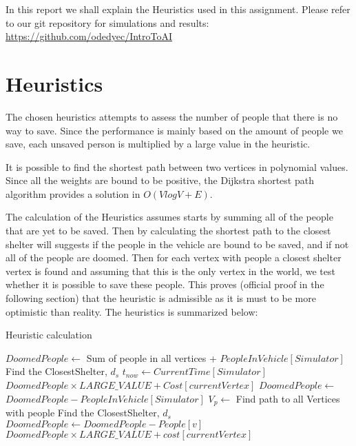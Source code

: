 \documentclass{article}                     %
\begin{document}
	
	In this report we shall explain the Heuristics used in this assignment. Please refer to our git repository for simulations and results:
	\url{https://github.com/odedyec/IntroToAI}
	
	
	
	\section{Heuristics}
	The chosen heuristics attempts to assess the number of people that there is no way to save. Since the performance is mainly based on the amount of people we save, each unsaved person is multiplied by a large value in the heuristic.
	
	It is possible to find the shortest path between two vertices in polynomial values. Since all the weights are bound to be positive, the Dijkstra shortest path algorithm provides a solution in $ O(V logV+E) $.
	
	The calculation of the Heuristics assumes starts by summing all of the people that are yet to be saved. Then by calculating the shortest path to the closest shelter will suggests if the people in the vehicle are bound to be saved, and if not all of the people are doomed. Then for each vertex with people a closest shelter vertex is found and assuming that this is the only vertex in the world, we test whether it is possible to save these people. This proves (official proof in the following section) that the heuristic is admissible as it is must to be more optimistic than reality.
	The heuristics is summarized below:
	
	\begin{algorithm}
		\caption{Heuristic calculation}
		
		\begin{algorithmic}[1]
			\State $ DoomedPeople \longleftarrow$ Sum of people in all vertices + $ PeopleInVehicle[Simulator] $
			\State Find the ClosestShelter, $d_s$
			\State $ t_{now} \longleftarrow CurrentTime[Simulator] $
			\State \Return $ DoomedPeople \times LARGE\_VALUE + Cost[currentVertex]$
			\Else 
			\State $ DoomedPeople \longleftarrow$ $ DoomedPeople - PeopleInVehicle[Simulator]$ 
			\EndIf
			\State $ V_p \longleftarrow$ Find path to all Vertices with people
			\State Find the ClosestShelter, $d_s$
			\State $ DoomedPeople \longleftarrow DoomedPeople - People[v]$
			\EndIf
			\EndFor
			\State \Return $ DoomedPeople \times LARGE\_VALUE + cost[currentVertex]$
			\EndProcedure
		\end{algorithmic}
	\end{algorithm}
	
\end{document}
